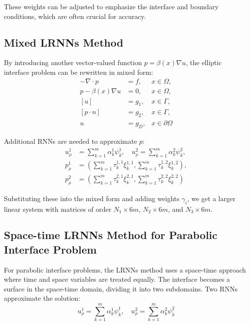 \documentclass[11pt]{article}
\begin{document}
These weights can be adjusted to emphasize the interface and boundary conditions, which are often crucial for accuracy.

\subsection{Mixed LRNNs Method}

By introducing another vector-valued function $p = \beta(x)\nabla u$, the elliptic interface problem can be rewritten in mixed form:
\begin{align}
-\nabla \cdot p &= f, &x \in \Omega, \\
p - \beta(x)\nabla u &= 0, &x \in \Omega, \\
[u] &= g_1, &x \in \Gamma, \\
[p \cdot n] &= g_2, &x \in \Gamma, \\
u &= g_D, &x \in \partial\Omega
\end{align}

Additional RNNs are needed to approximate $p$:
\begin{align}
u_\rho^1 &= \sum_{k=1}^{m} \alpha_k^1 \psi_k^1, \quad u_\rho^2 = \sum_{k=1}^{m} \alpha_k^2 \psi_k^2, \\
p_\rho^1 &= \left(\sum_{k=1}^{m} \tau_k^{1,1} \xi_k^{1,1}, \sum_{k=1}^{m} \tau_k^{1,2} \xi_k^{1,2}\right), \\
p_\rho^2 &= \left(\sum_{k=1}^{m} \tau_k^{2,1} \xi_k^{2,1}, \sum_{k=1}^{m} \tau_k^{2,2} \xi_k^{2,2}\right)
\end{align}

Substituting these into the mixed form and adding weights $\gamma_i$, we get a larger linear system with matrices of order $N_1 \times 6m$, $N_2 \times 6m$, and $N_3 \times 6m$.

\subsection{Space-time LRNNs Method for Parabolic Interface Problem}

For parabolic interface problems, the LRNNs method uses a space-time approach where time and space variables are treated equally. The interface becomes a surface in the space-time domain, dividing it into two subdomains. Two RNNs approximate the solution:
\begin{equation}
u_\rho^1 = \sum_{k=1}^{m} \alpha_k^1 \psi_k^1, \quad u_\rho^2 = \sum_{k=1}^{m} \alpha_k^2 \psi_k^2
\end{equation}
\end{document}
